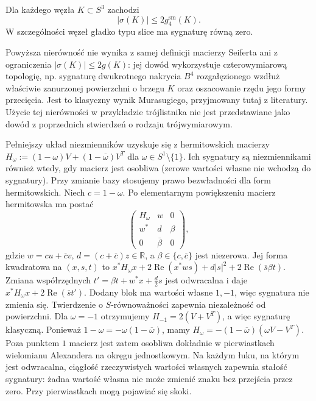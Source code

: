 \begin{twierdzenie}
\label{thm:kt-signature-four-genus}
Dla każdego węzła $K\subset S^3$ zachodzi
\[
|\sigma(K)|\le 2g_4^{\mathrm{sm}}(K).
\]
W szczególności węzeł gładko typu slice ma
sygnaturę równą zero.
\end{twierdzenie}

\begin{uwaga}
Powyższa nierówność nie wynika z samej
definicji macierzy Seiferta ani z ograniczenia
$|\sigma(K)|\le2g(K)$: jej dowód wykorzystuje
czterowymiarową topologię, np. sygnaturę
dwukrotnego nakrycia $B^4$ rozgałęzionego
wzdłuż właściwie zanurzonej powierzchni
o brzegu $K$ oraz oszacowanie rzędu jego
formy przecięcia. Jest to klasyczny
wynik Murasugiego, przyjmowany tutaj
z literatury. Użycie tej nierówności
w przykładzie trójlistnika nie jest
przedstawiane jako dowód z poprzednich
stwierdzeń o rodzaju trójwymiarowym.
\end{uwaga}

\begin{uwaga}
Pełniejszy układ niezmienników uzyskuje się z hermitowskich
macierzy $H_\omega:=(1-\omega)V+(1-\overline\omega)V^T$
dla $\omega\in S^1\setminus\{1\}$.
Ich sygnatury są niezmiennikami również wtedy, gdy
macierz jest osobliwa (zerowe wartości własne nie
wchodzą do sygnatury). Przy zmianie bazy stosujemy
prawo bezwładności dla form hermitowskich.
Niech $c=1-\omega$. Po elementarnym powiększeniu
macierz hermitowska ma postać
\[
\begin{pmatrix}H_\omega&w&0\\w^*&d&\beta\\0&\overline\beta&0\end{pmatrix},
\]
gdzie $w=cu+\overline c v$, $d=(c+\overline c)z\in\mathbb R$,
a $\beta\in\{c,\overline c\}$ jest niezerowa.
Jej forma kwadratowa na $(x,s,t)$ to
$x^*H_\omega x+2\operatorname{Re}(x^*ws)
+d|s|^2+2\operatorname{Re}(\overline s\beta t)$.
Zmiana współrzędnych
$t'=\beta t+w^*x+\tfrac d2 s$ jest odwracalna
i daje $x^*H_\omega x+2\operatorname{Re}(\overline s t')$.
Dodany blok ma wartości własne $1,-1$, więc
sygnatura nie zmienia się. Twierdzenie o $S$-równoważności
zapewnia niezależność od powierzchni.
Dla $\omega=-1$ otrzymujemy
$H_{-1}=2(V+V^T)$, a więc sygnaturę klasyczną.
Ponieważ $1-\omega=-\omega(1-\overline\omega)$,
mamy $H_\omega=-(1-\overline\omega)(\omega V-V^T)$.
Poza punktem $1$ macierz jest zatem osobliwa dokładnie
w pierwiastkach wielomianu Alexandera na okręgu
jednostkowym. Na każdym łuku, na którym jest odwracalna,
ciągłość rzeczywistych wartości własnych zapewnia
stałość sygnatury: żadna wartość własna nie może
zmienić znaku bez przejścia przez zero. Przy
pierwiastkach mogą pojawiać się skoki.
\end{uwaga}

